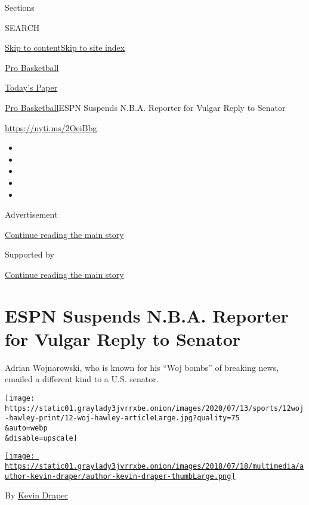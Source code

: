 Sections

SEARCH

\protect\hyperlink{site-content}{Skip to
content}\protect\hyperlink{site-index}{Skip to site index}

\href{https://www.nytimes3xbfgragh.onion/section/sports/basketball}{Pro
Basketball}

\href{https://myaccount.nytimes3xbfgragh.onion/auth/login?response_type=cookie\&client_id=vi}{}

\href{https://www.nytimes3xbfgragh.onion/section/todayspaper}{Today's
Paper}

\href{/section/sports/basketball}{Pro Basketball}\textbar{}ESPN Suspends
N.B.A. Reporter for Vulgar Reply to Senator

\url{https://nyti.ms/2OeiBbg}

\begin{itemize}
\item
\item
\item
\item
\item
\end{itemize}

Advertisement

\protect\hyperlink{after-top}{Continue reading the main story}

Supported by

\protect\hyperlink{after-sponsor}{Continue reading the main story}

\hypertarget{espn-suspends-nba-reporter-for-vulgar-reply-to-senator}{%
\section{ESPN Suspends N.B.A. Reporter for Vulgar Reply to
Senator}\label{espn-suspends-nba-reporter-for-vulgar-reply-to-senator}}

Adrian Wojnarowski, who is known for his ``Woj bombs'' of breaking news,
emailed a different kind to a U.S. senator.

\texttt{[image: https://static01.graylady3jvrrxbe.onion/images/2020/07/13/sports/12woj-hawley-print/12-woj-hawley-articleLarge.jpg?quality=75\\\&auto=webp\\\&disable=upscale]}

\href{https://www.nytimes3xbfgragh.onion/by/kevin-draper}{\texttt{[image: https://static01.graylady3jvrrxbe.onion/images/2018/07/18/multimedia/author-kevin-draper/author-kevin-draper-thumbLarge.png]}}

By \href{https://www.nytimes3xbfgragh.onion/by/kevin-draper}{Kevin
Draper}

